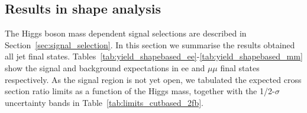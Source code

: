 

\subsection{Results in shape analysis} 

The Higgs boson mass dependent signal selections are described in Section~\ref{sec:signal_selection}. 
In this section we summarise the results obtained all jet final states. 
Tables~\ref{tab:yield_shapebased_ee}-\ref{tab:yield_shapebased_mm} show the signal %
and background expectations in ee and $\mu\mu$ final states respectively. 
As the signal region is not yet open, we tabulated the expected cross section ratio limits as a function 
of the Higgs mass, together with the 1/2-$\sigma$ uncertainty bands in Table~\ref{tab:limits_cutbased_2fb}.


